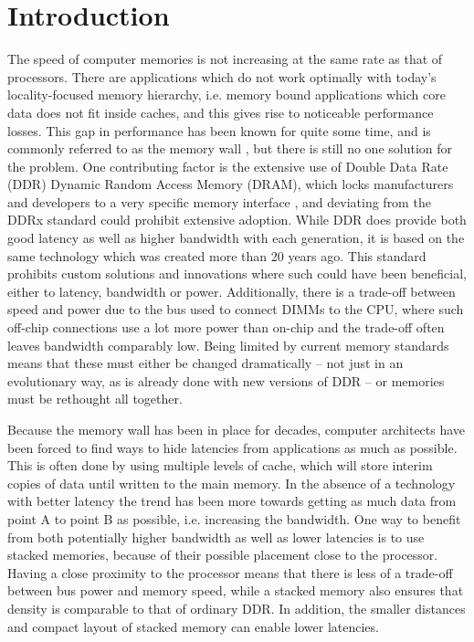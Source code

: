\chapter{Introduction} \label{intro}
The speed of computer memories is not increasing at the same rate as that of processors. There are applications which do not work optimally with today's locality-focused memory hierarchy, i.e. memory bound applications which core data does not fit inside caches, and this gives rise to noticeable performance losses. This gap in performance has been known for quite some time, and is commonly referred to as the memory wall \cite{wulf1995hitting}, but there is still no one solution for the problem. One contributing factor is the extensive use of Double Data Rate (DDR) Dynamic Random Access Memory (DRAM), which locks manufacturers and developers to a very specific memory interface \cite{standard2008double}, and deviating from the DDRx standard could prohibit extensive adoption. While DDR does provide both good latency as well as higher bandwidth with each generation, it is based on the same technology which was created more than 20 years ago. This standard prohibits custom solutions and innovations where such could have been beneficial, either to latency, bandwidth or power. Additionally, there is a trade-off between speed and power due to the bus used to connect DIMMs to the CPU, where such off-chip connections use a lot more power than on-chip and the trade-off often leaves bandwidth comparably low. Being limited by current memory standards means that these must either be changed dramatically -- not just in an evolutionary way, as is already done with new versions of DDR -- or memories must be rethought all together.
\bigskip

Because the memory wall has been in place for decades, computer architects have been forced to find ways to hide latencies from applications as much as possible. This is often done by using multiple levels of cache, which will store interim copies of data until written to the main memory. In the absence of a technology with better latency the trend has been more towards getting as much data from point A to point B as possible, i.e. increasing the bandwidth. One way to benefit from both potentially higher bandwidth as well as lower latencies is to use stacked memories, because of their possible placement close to the processor. Having a close proximity to the processor means that there is less of a trade-off between bus power and memory speed, while a stacked memory also ensures that density is comparable to that of ordinary DDR. In addition, the smaller distances and compact layout of stacked memory can enable lower latencies.
\bigskip


